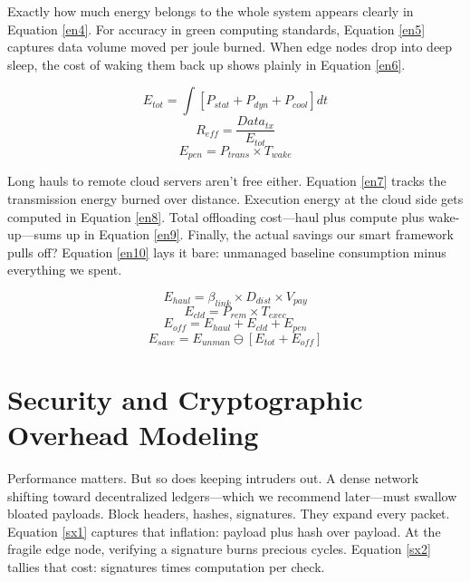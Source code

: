 \documentclass[a4paper,fleqn]{cas-dc}
\numberwithin{equation}{section}
\begin{document}
Exactly how much energy belongs to the whole system appears clearly in Equation \ref{en4}. For accuracy in green computing standards, Equation \ref{en5} captures data volume moved per joule burned. When edge nodes drop into deep sleep, the cost of waking them back up shows plainly in Equation \ref{en6}.

\begin{equation} E_{tot} = \int [ P_{stat} + P_{dyn} + P_{cool} ] dt \label{en4} \end{equation}
\begin{equation} R_{eff} = \frac{Data_{tx}}{E_{tot}} \label{en5} \end{equation}
\begin{equation} E_{pen} = P_{trans} \times T_{wake} \label{en6} \end{equation}

Long hauls to remote cloud servers aren't free either. Equation \ref{en7} tracks the transmission energy burned over distance. Execution energy at the cloud side gets computed in Equation \ref{en8}. Total offloading cost—haul plus compute plus wake-up—sums up in Equation \ref{en9}. Finally, the actual savings our smart framework pulls off? Equation \ref{en10} lays it bare: unmanaged baseline consumption minus everything we spent.

\begin{equation} E_{haul} = \beta_{link} \times D_{dist} \times V_{pay} \label{en7} \end{equation}
\begin{equation} E_{cld} = P_{rem} \times T_{exec} \label{en8} \end{equation}
\begin{equation} E_{off} = E_{haul} + E_{cld} + E_{pen} \label{en9} \end{equation}
\begin{equation} E_{save} = E_{unman} \ominus [ E_{tot} + E_{off} ] \label{en10} \end{equation}

\section{Security and Cryptographic Overhead Modeling}

Performance matters. But so does keeping intruders out. A dense network shifting toward decentralized ledgers—which we recommend later—must swallow bloated payloads. Block headers, hashes, signatures. They expand every packet. Equation \ref{sx1} captures that inflation: payload plus hash over payload. At the fragile edge node, verifying a signature burns precious cycles. Equation \ref{sx2} tallies that cost: signatures times computation per check.
\end{document}
